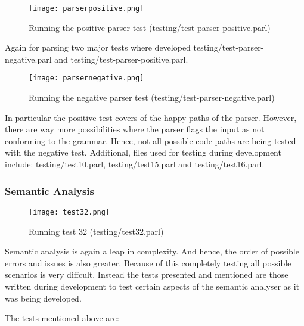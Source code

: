 \begin{figure}[H]
\centering
\texttt{[image: parserpositive.png]}
\caption{Running the positive parser test
(testing/test-parser-positive.parl)}
\end{figure}

Again for parsing two major tests where developed
testing/test-parser-negative.parl and
testing/test-parser-positive.parl.

\begin{figure}[H]
\centering
\texttt{[image: parsernegative.png]}
\caption{Running the negative parser test
(testing/test-parser-negative.parl)}
\end{figure}

In particular the positive test covers of the happy paths of the
parser. However, there are way more possibilities where the
parser flags the input as not conforming to the grammar. Hence,
not all possible code paths are being tested with the negative
test. Additional, files used for testing during development
include: testing/test10.parl, testing/test15.parl and
testing/test16.parl.

\subsubsection{Semantic Analysis}

\begin{figure}[H]
\centering
\texttt{[image: test32.png]}
\caption{Running test 32 (testing/test32.parl)}
\end{figure}

Semantic analysis is again a leap in complexity. And hence, the
order of possible errors and issues is also greater. Because of
this completely testing all possible scenarios is very diffcult.
Instead the tests presented and mentioned are those written
during development to test certain aspects of the semantic
analyser as it was being developed.

The tests mentioned above are:

